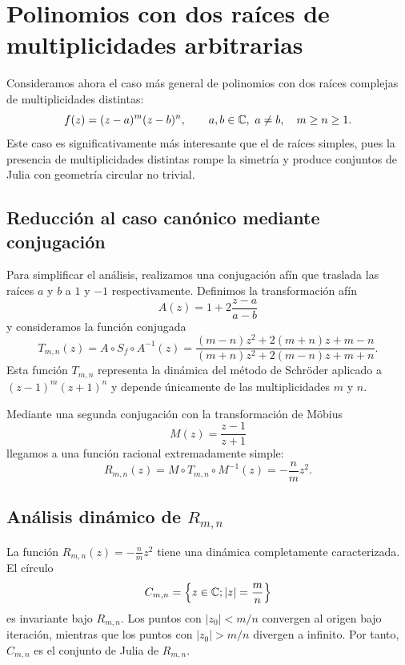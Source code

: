 \section{Polinomios con dos raíces de multiplicidades arbitrarias}

Consideramos ahora el caso más general de polinomios con dos raíces complejas de multiplicidades distintas:
\begin{equation}
 f(z)=(z-a)^m(z-b)^n,\qquad a,b\in\mathbb{C},\ a\ne b,\quad m\ge n\ge 1.
 \label{eq:poly_dos_raices}
\end{equation}
Este caso es significativamente más interesante que el de raíces simples, pues la presencia de multiplicidades distintas rompe la simetría y produce conjuntos de Julia con geometría circular no trivial.

\subsection{Reducción al caso canónico mediante conjugación}

Para simplificar el análisis, realizamos una conjugación afín que traslada las raíces $a$ y $b$ a $1$ y $-1$ respectivamente. Definimos la transformación afín
\begin{equation}
A(z)=1+2\frac{z-a}{a-b}
\label{eq:afin}
\end{equation}
y consideramos la función conjugada
\begin{equation}
T_{m,n}(z)=A\circ S_f\circ A^{-1}(z)=\frac{(m-n) z^2 +2 (m+n) z +m-n}{(m+n) z^2 +2(m-n)z +m+n}.
\label{eq:Tmn}
\end{equation}
Esta función $T_{m,n}$ representa la dinámica del método de Schröder aplicado a $(z-1)^m(z+1)^n$ y depende únicamente de las multiplicidades $m$ y $n$.

Mediante una segunda conjugación con la transformación de Möbius
\begin{equation}
M(z)=\frac{z-1}{z+1}
\label{eq:Mobius}
\end{equation}
llegamos a una función racional extremadamente simple:
\begin{equation}
R_{m,n}(z)=M\circ T_{m,n}\circ M^{-1}(z)=-\frac{n}{m}z^2.
\label{eq:Rmn}
\end{equation}

\subsection{Análisis dinámico de $R_{m,n}$}

La función $R_{m,n}(z)=-\tfrac{n}{m}z^2$ tiene una dinámica completamente caracterizada. El círculo
$$
C_{m,n}=\left\{z\in\mathbb{C}; |z|=\frac{m}{n}\right\}
$$
es invariante bajo $R_{m,n}$. Los puntos con $|z_0|<m/n$ convergen al origen bajo iteración, mientras que los puntos con $|z_0|>m/n$ divergen a infinito. Por tanto, $C_{m,n}$ es el conjunto de Julia de $R_{m,n}$.

